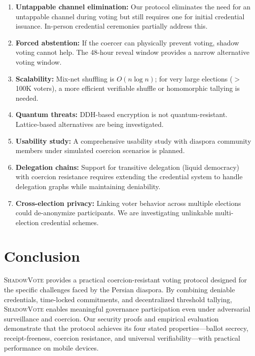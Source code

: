 \documentclass[11pt,a4paper]{article}
\newcommand{\shadow}{\textsc{ShadowVote}\xspace}
\begin{document}
\begin{enumerate}
    \item \textbf{Untappable channel elimination:} Our protocol eliminates the need for an untappable channel during voting but still requires one for initial credential issuance. In-person credential ceremonies partially address this.
    \item \textbf{Forced abstention:} If the coercer can physically prevent voting, shadow voting cannot help. The 48-hour reveal window provides a narrow alternative voting window.
    \item \textbf{Scalability:} Mix-net shuffling is $O(n \log n)$; for very large elections ($>$100K voters), a more efficient verifiable shuffle or homomorphic tallying is needed.
    \item \textbf{Quantum threats:} DDH-based encryption is not quantum-resistant. Lattice-based alternatives are being investigated.
    \item \textbf{Usability study:} A comprehensive usability study with diaspora community members under simulated coercion scenarios is planned.
    \item \textbf{Delegation chains:} Support for transitive delegation (liquid democracy) with coercion resistance requires extending the credential system to handle delegation graphs while maintaining deniability.
    \item \textbf{Cross-election privacy:} Linking voter behavior across multiple elections could de-anonymize participants. We are investigating unlinkable multi-election credential schemes.
\end{enumerate}

\section{Conclusion}

\shadow provides a practical coercion-resistant voting protocol designed for the specific challenges faced by the Persian diaspora. By combining deniable credentials, time-locked commitments, and decentralized threshold tallying, \shadow enables meaningful governance participation even under adversarial surveillance and coercion. Our security proofs and empirical evaluation demonstrate that the protocol achieves its four stated properties---ballot secrecy, receipt-freeness, coercion resistance, and universal verifiability---with practical performance on mobile devices.


\end{document}
